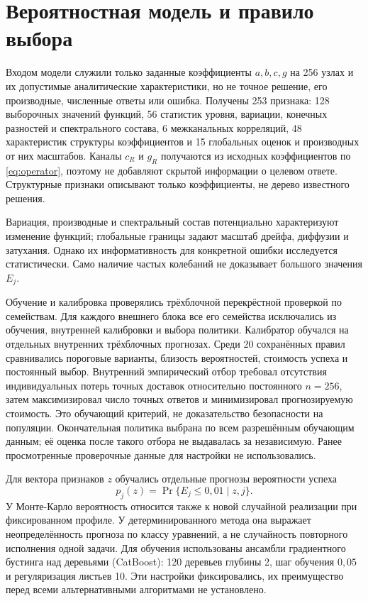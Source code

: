 \section{Вероятностная модель и правило выбора}
Входом модели служили только заданные коэффициенты $a,b,c,g$ на 256 узлах и их допустимые аналитические характеристики, но не точное решение, его производные, численные ответы или ошибка. Получены 253 признака: 128 выборочных значений функций, 56 статистик уровня, вариации, конечных разностей и спектрального состава, 6 межканальных корреляций, 48 характеристик структуры коэффициентов и 15 глобальных оценок и производных от них масштабов. Каналы $c_R$ и $g_R$ получаются из исходных коэффициентов по \eqref{eq:operator}, поэтому не добавляют скрытой информации о целевом ответе. Структурные признаки описывают только коэффициенты, не дерево известного решения.

Вариация, производные и спектральный состав потенциально характеризуют изменение функций; глобальные границы задают масштаб дрейфа, диффузии и затухания. Однако их информативность для конкретной ошибки исследуется статистически. Само наличие частых колебаний не доказывает большого значения $E_j$.


Обучение и калибровка проверялись трёхблочной перекрёстной проверкой по семействам. Для каждого внешнего блока все его семейства исключались из обучения, внутренней калибровки и выбора политики. Калибратор обучался на отдельных внутренних трёхблочных прогнозах. Среди 20 сохранённых правил сравнивались пороговые варианты, близость вероятностей, стоимость успеха и постоянный выбор. Внутренний эмпирический отбор требовал отсутствия индивидуальных потерь точных доставок относительно постоянного $n=256$, затем максимизировал число точных ответов и минимизировал прогнозируемую стоимость. Это обучающий критерий, не доказательство безопасности на популяции. Окончательная политика выбрана по всем разрешённым обучающим данным; её оценка после такого отбора не выдавалась за независимую. Ранее просмотренные проверочные данные для настройки не использовались.

\clearpage
{}
Для вектора признаков $z$ обучались отдельные прогнозы вероятности успеха
\begin{equation}\label{eq:probability}
p_j(z)=\Pr\{E_j\le0{,}01\mid z,j\}.
\end{equation}
У Монте-Карло вероятность относится также к новой случайной реализации при фиксированном профиле. У детерминированного метода она выражает неопределённость прогноза по классу уравнений, а не случайность повторного исполнения одной задачи. Для обучения использованы ансамбли градиентного бустинга над деревьями (CatBoost): 120 деревьев глубины 2, шаг обучения $0{,}05$ и регуляризация листьев 10. Эти настройки фиксировались, их преимущество перед всеми альтернативными алгоритмами не установлено.

